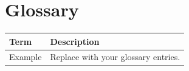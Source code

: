 \chapter*{Glossary}

\begin{tabular}{|m{3cm}|m{10cm}|}
\hline
\textbf{Term} & \textbf{Description} \\ \hline
Example & Replace with your glossary entries. \\ \hline
\end{tabular}
